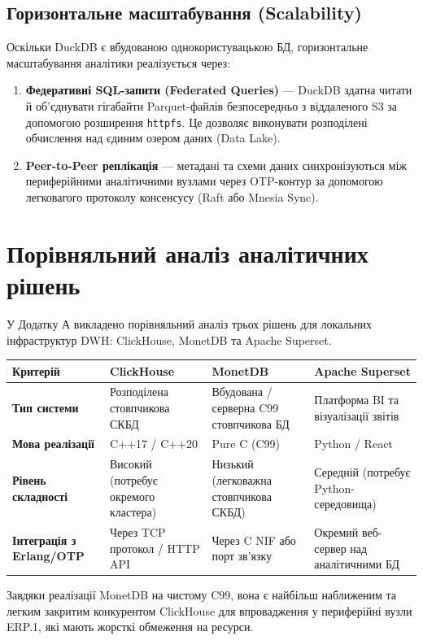 \subsection{Горизонтальне масштабування (Scalability)}
Оскільки DuckDB є вбудованою однокористувацькою БД, горизонтальне масштабування аналітики реалізується через:
\begin{enumerate}
    \item \textbf{Федеративні SQL-запити (Federated Queries)} --- DuckDB здатна читати й об'єднувати гігабайти Parquet-файлів безпосередньо з віддаленого S3 за допомогою розширення \texttt{httpfs}. Це дозволяє виконувати розподілені обчислення над єдиним озером даних (Data Lake).
    \item \textbf{Peer-to-Peer реплікація} --- метадані та схеми даних синхронізуються між периферійними аналітичними вузлами через OTP-контур за допомогою легковагого протоколу консенсусу (Raft або Mnesia Sync).
\end{enumerate}

\section{Порівняльний аналіз аналітичних рішень}
У Додатку А викладено порівняльний аналіз трьох рішень для локальних інфраструктур DWH: ClickHouse, MonetDB та Apache Superset.

\begin{center}
\small
\begin{longtable}{p{3.5cm} p{3.5cm} p{3.5cm} p{3.5cm}}
\toprule
\textbf{Критерій} & \textbf{ClickHouse} & \textbf{MonetDB} & \textbf{Apache Superset} \\
\midrule
\textbf{Тип системи} & Розподілена стовпчикова СКБД & Вбудована / серверна C99 стовпчикова БД & Платформа BI та візуалізації звітів \\
\textbf{Мова реалізації} & C++17 / C++20 & Pure C (C99) & Python / React \\
\textbf{Рівень складності} & Високий (потребує окремого кластера) & Низький (легковажна стовпчикова СКБД) & Середній (потребує Python-середовища) \\
\textbf{Інтеграція з Erlang/OTP} & Через TCP протокол / HTTP API & Через C NIF або порт зв'язку & Окремий веб-сервер над аналітичними БД \\
\bottomrule
\end{longtable}
\end{center}

Завдяки реалізації MonetDB на чистому C99, вона є найбільш наближеним та легким закритим конкурентом ClickHouse для впровадження у периферійні вузли ERP.1, які мають жорсткі обмеження на ресурси.

